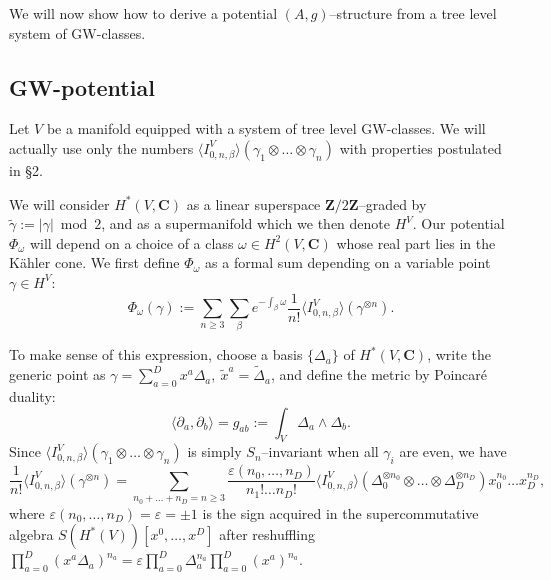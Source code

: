 \documentclass[reqno]{amsart}
\theoremstyle{definition}
\begin{document}
We will now show how to derive a potential $(A,g)$--structure
from a tree level system of GW-classes.

\medskip

\subsection{GW-potential}
Let $V$ be a manifold equipped with a
system of tree level GW-classes. We will actually use only
the numbers $\langle I^V_{0,n,\beta}\rangle (\gamma_1\otimes\dots
\otimes\gamma_n)$ with properties postulated in \S 2.

\smallskip

We will consider $H^*(V,\mathbf{C})$ as a linear superspace
$\mathbf{Z}/2\mathbf{Z}$--graded by $\tilde{\gamma}:={|\gamma| \bmod2}$,
and as a supermanifold which we then denote
$H^V$. Our potential $\Phi_{\omega}$ will depend on a choice
of a class $\omega\in H^2(V,\mathbf{C})$ whose real part lies
in the K\"ahler cone. We first define $\Phi_{\omega}$
as a formal sum depending on a variable point $\gamma\in H^V$:
\begin{equation*}
  \Phi_{\omega}(\gamma)
  :=\sum_{n\ge 3}\sum_{\beta}
  e^{-\int_{\beta}\omega }\frac{1}{n!}
  \langle I^V_{0,n,\beta}\rangle
  (\gamma^{\otimes n}).
  \tag{4.14}
\end{equation*}

To make sense of this expression, choose a basis $\{ \Delta_a\}$ of
$H^*(V,\mathbf{C})$, write the generic point as $\gamma =\sum_{a=0}^D
x^a\Delta_a,\ \tilde{x}^a=\tilde{\Delta}_a$, and define the metric
by Poincar\'e duality:
\begin{equation*}
  \langle \partial_a,\partial_b\rangle =g_{ab}
  :=\int_V \Delta_a\wedge\Delta_b.
  \tag{4.15}
\end{equation*}
Since $\langle I^V_{0,n,\beta}\rangle (\gamma_1\otimes\dots\otimes\gamma_n)$
is simply $S_n$--invariant when all $\gamma_i$ are even,
we have
\begin{equation*}
  \frac{1}{n!}\langle I^V_{0,n,\beta}\rangle (\gamma^{\otimes n})=
  \sum_{n_0+\dots +n_D=n\ge 3}\frac{\varepsilon(n_0,\dots ,n_D)}{n_1!\dots n_D!}
  \langle I^V_{0,n,\beta}\rangle
  (\Delta_0^{\otimes n_0}\otimes\dots\otimes \Delta_D^{\otimes n_D})
  x_0^{n_0}\dots x_D^{n_D},
  \tag{4.16}
\end{equation*}
where $\varepsilon (n_0,\dots ,n_D)=\varepsilon =\pm 1$ is the sign
acquired in the supercommutative algebra \linebreak
$S(H^*(V))[x^0,\dots ,x^D]$
after reshuffling $\prod_{a=0}^D(x^a\Delta_a)^{n_a}=\varepsilon
\prod_{a=0}^D\Delta_a^{n_a}\prod_{a=0}^D(x^a)^{n_a}$.
\end{document}

